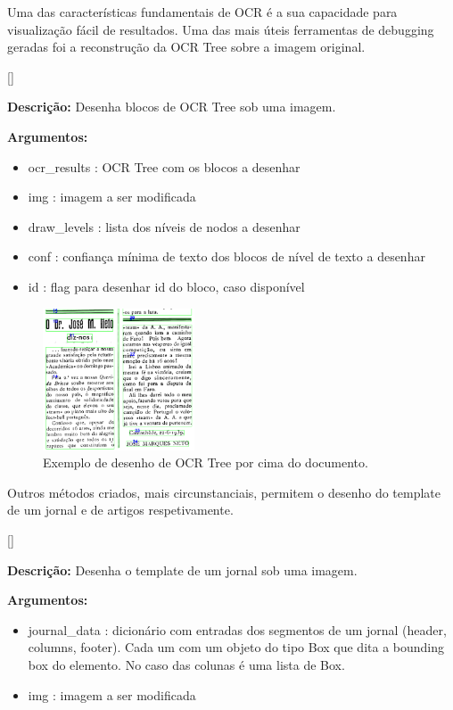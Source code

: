 \label{contribution_debugging}

Uma das características fundamentais de OCR é a sua capacidade para visualização fácil de resultados. Uma das mais úteis ferramentas de debugging geradas foi a reconstrução da OCR Tree sobre a imagem original.

[\normalsize]

\textbf{Descrição:} Desenha blocos de OCR Tree sob uma imagem.

\textbf{Argumentos:}
\begin{itemize}\setlength\itemsep{-0.3em}
	\vspace{-0.5em}
	\item ocr\_results : OCR Tree com os blocos a desenhar
	\item img : imagem a ser modificada
	\item draw\_levels : lista dos níveis de nodos a desenhar
	\item conf : confiança mínima de texto dos blocos de nível de texto a desenhar
	\item id : flag para desenhar id do bloco, caso disponível
\end{itemize}

\begin{figure}[H]
	 	\centering
	 	\includegraphics[width=0.4\textwidth]{images/ilustracoes/drawn_blocks.png}
	 	\caption{Exemplo de desenho de OCR Tree por cima do documento.}
	 	\label{fig:draw_ocr_results}
\end{figure}

Outros métodos criados, mais circunstanciais, permitem o desenho do template de um jornal e de artigos respetivamente.

[\normalsize]

\textbf{Descrição:} Desenha o template de um jornal sob uma imagem.

\textbf{Argumentos:}
\begin{itemize}\setlength\itemsep{-0.3em}
	\vspace{-0.5em}
	\item journal\_data : dicionário com entradas dos segmentos de um jornal (header, columns, footer). Cada um com um objeto do tipo Box que dita a bounding box do elemento. No caso das colunas é uma lista de Box.
	\item img : imagem a ser modificada
\end{itemize}


